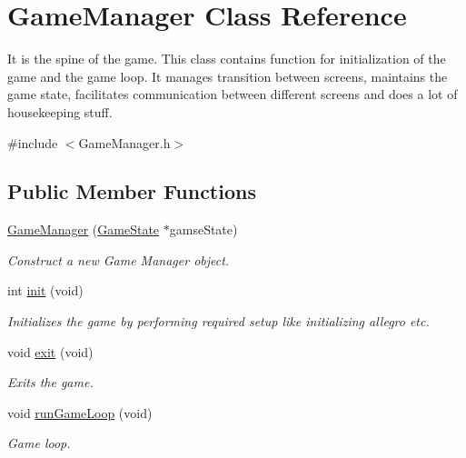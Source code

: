 \hypertarget{class_game_manager}{}\section{Game\+Manager Class Reference}
\label{class_game_manager}


It is the spine of the game. This class contains function for initialization of the game and the game loop. It manages transition between screens, maintains the game state, facilitates communication between different screens and does a lot of housekeeping stuff.  




{\ttfamily \#include $<$Game\+Manager.\+h$>$}

\subsection*{Public Member Functions}
\begin{DoxyCompactItemize}
\item 
\mbox{\hyperlink{class_game_manager_aa9d8973a248b62eb1ad5e88ca0ad04ee}{Game\+Manager}} (\mbox{\hyperlink{struct_game_state}{Game\+State}} $\ast$gamse\+State)
\begin{DoxyCompactList}\small\item\em Construct a new Game Manager object. \end{DoxyCompactList}\item 
int \mbox{\hyperlink{class_game_manager_a0b2f746268718b7fccc05c178217fcff}{init}} (void)
\begin{DoxyCompactList}\small\item\em Initializes the game by performing required setup like initializing allegro etc. \end{DoxyCompactList}\item 
void \mbox{\hyperlink{class_game_manager_a9642ca91519c300ba48cc1960d3aaf46}{exit}} (void)
\begin{DoxyCompactList}\small\item\em Exits the game. \end{DoxyCompactList}\item 
void \mbox{\hyperlink{class_game_manager_a7a840d42c2e52b2f827800bbac51c944}{run\+Game\+Loop}} (void)
\begin{DoxyCompactList}\small\item\em Game loop. \end{DoxyCompactList}\end{DoxyCompactItemize}


